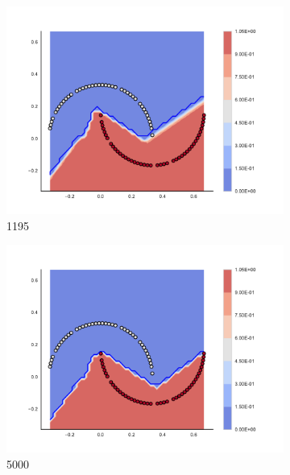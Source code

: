 \begin{figure}[h]
\begin{subfigure}[b]{0.09\textwidth}
    \includegraphics[clip, trim=2.35cm 1.75cm 4.5cm 0cm,width=\textwidth]{img/convergence/1195.pdf}
    \caption{1195}
    \label{fig:convergence_1195}
\end{subfigure}
%
\begin{subfigure}[b]{0.09\textwidth}
    \includegraphics[clip, trim=2.35cm 1.75cm 4.5cm 0cm,width=\textwidth]{img/convergence/5000.pdf}
    \caption{5000}
    \label{fig:convergence_5000}
\end{subfigure}
%
\begin{subfigure}[b]{0.09\textwidth}

\end{subfigure}
\end{figure}
